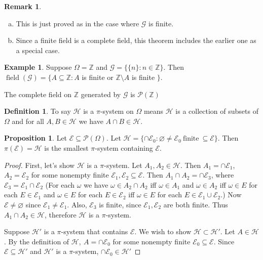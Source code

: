 \documentclass{article}
\DeclareMathOperator{\field}{field}
\newcommand{\Z}{\mathbb{Z}}
\theoremstyle{definition}
\newtheorem{proposition}[theorem]{Proposition}
\newtheorem*{example}{Example}
\newtheorem*{definition}{Definition}
\newtheorem*{remark}{Remark}
\begin{document}
\begin{remark}
    \begin{enumerate}[(a)]
        \item This is just proved as in the case where $\mathscr{G}$ is finite.
        \item Since a finite field is a complete field, this theorem includes the earlier one as a special case.
    \end{enumerate}
\end{remark}

\begin{example}
Suppose $\Omega = \Z$ and $\mathscr{G} = \{ \{n\} : n \in \Z\}$. Then $\field (\mathscr{G}) = \{A \subseteq \Z : A$ is finite or $\Z\setminus A$ is finite $\}$.
\end{example}

The complete field on $\Z$ generated by $\mathscr{G}$ is $\mathcal{P}(\Z)$

\begin{definition}
    To say $\mathscr{H}$ is a $\pi$-system on $\Omega$ means $\mathscr{H}$ is a collection of subsets of $\Omega$ and for all $A,B \in \mathscr{H}$ we have $A \cap B \in \mathscr{H}$.
\end{definition}

\begin{proposition}
    Let $\mathscr{E} \subseteq \mathcal{P}(\Omega)$. Let $\mathscr{H} = \{ \cap \mathscr{E}_0 : \varnothing \neq \mathscr{E}_0 \ \text{finite} \ \subseteq \mathscr{E}\}$. Then $\pi(\mathscr{E}) = \mathscr{H}$ is the smallest $\pi$-system containing $\mathscr{E}$.
\end{proposition}



\begin{proof}
    First, let's show $\mathscr{H}$ is a $\pi$-system. Let $A_1, A_2 \in \mathscr{H}$. Then $A_1 = \cap \mathscr{E}_1$, $A_2 = \mathscr{E}_2$ for some nonempty finite $\mathscr{E}_1,\mathscr{E}_2 \subseteq \mathscr{E}$.
    Then $A_1 \cap A_2 = \cap \mathscr{E}_3$, where $\mathscr{E}_3 = \mathscr{E}_1 \cap \mathscr{E}_2$ (For each $\omega$ we have $\omega \in A_2 \cap A_2$ iff $\omega \in A_1$ and $\omega \in A_2$ iff $\omega \in E$ for each $E \in \mathscr{E}_1$ and $\omega \in E$ for each $E \in \mathscr{E}_2$ iff $\omega \in E$ for each $E \in \mathscr{E}_1 \cup \mathscr{E}_2$.)
    Now $\mathscr{E} \neq \varnothing$ since $\mathscr{E}_1 \neq \mathscr{E}_1$.
    Also, $\mathscr{E}_3$ is finite, since $\mathscr{E}_1,\mathscr{E}_2$ are both finite. Thus $A_1 \cap A_2 \in \mathscr{H}$, therefore $\mathscr{H}$ is a $\pi$-system.
    
    Suppose $\mathscr{H}'$ is a $\pi$-system that contains $\mathscr{E}$. We wish to show $\mathscr{H} \subset \mathscr{H}'$. Let $A \in \mathscr{H}$. By the definition of $\mathscr{H},\ A = \cap \mathscr{E}_0$ for some nonempty finite $\mathscr{E}_0 \subseteq \mathscr{E}$. Since $\mathscr{E} \subseteq \mathscr{H}'$ and $\mathscr{H}'$ is a $\pi$-system, $\cap \mathscr{E}_0 \in \mathscr{H}'$
\end{proof}
\end{document}
